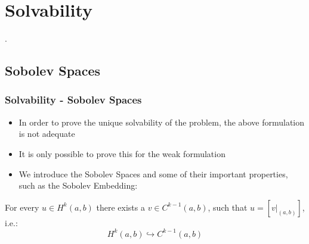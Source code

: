 \section{Solvability}
\PraesentationMasterWeissBlau
\begin{frame}
	\centering
	\vspace{6cm}
	\huge{\thesection . \secname}
\end{frame}
\PraesentationMasterStandard
\subsection{Sobolev Spaces}
\begin{frame}
	\frametitle{Solvability - Sobolev Spaces}
	\begin{itemize}
		\item In order to prove the unique solvability of the problem, the above formulation is not adequate
		\item It is only possible to prove this for the weak formulation
		\item We introduce the Sobolev Spaces and some of their important properties, such as the Sobolev Embedding:
	\end{itemize}

\begin{lemma}
	For every $u \in H^k(a,b)$ there exists a $v \in C^{k-1}(a,b)$, such that $u = [v \vert_{(a,b)}]$, i.e.:
	\begin{equation}
		H^k(a,b) \hookrightarrow C^{k-1}(a,b)
	\end{equation}
\end{lemma}

\end{frame}

